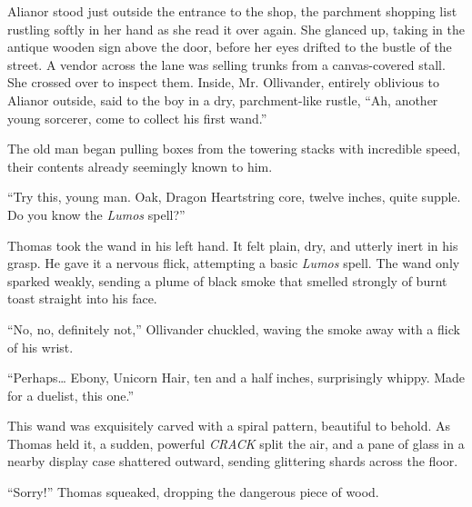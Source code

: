 Alianor stood just outside the entrance to the shop, the parchment shopping list rustling softly in her hand as she read it over again. She glanced up, taking in the antique wooden sign above the door, before her eyes drifted to the bustle of the street. A vendor across the lane was selling trunks from a canvas-covered stall. She crossed over to inspect them. Inside, Mr. Ollivander, entirely oblivious to Alianor outside, said to the boy in a dry, parchment-like rustle, \enquote{Ah, another young sorcerer, come to collect his first wand.}

The old man began pulling boxes from the towering stacks with incredible speed, their contents already seemingly known to him.

\enquote{Try this, young man. Oak, Dragon Heartstring core, twelve inches, quite supple. Do you know the \textit{Lumos} spell?}

Thomas took the wand in his left hand. It felt plain, dry, and utterly inert in his grasp. He gave it a nervous flick, attempting a basic \textit{Lumos} spell. The wand only sparked weakly, sending a plume of black smoke that smelled strongly of burnt toast straight into his face.

\enquote{No, no, definitely not,} Ollivander chuckled, waving the smoke away with a flick of his wrist.

\enquote{Perhaps\ldots{} Ebony, Unicorn Hair, ten and a half inches, surprisingly whippy. Made for a duelist, this one.}

This wand was exquisitely carved with a spiral pattern, beautiful to behold. As Thomas held it, a sudden, powerful \textit{CRACK} split the air, and a pane of glass in a nearby display case shattered outward, sending glittering shards across the floor.

\enquote{Sorry!} Thomas squeaked, dropping the dangerous piece of wood.

